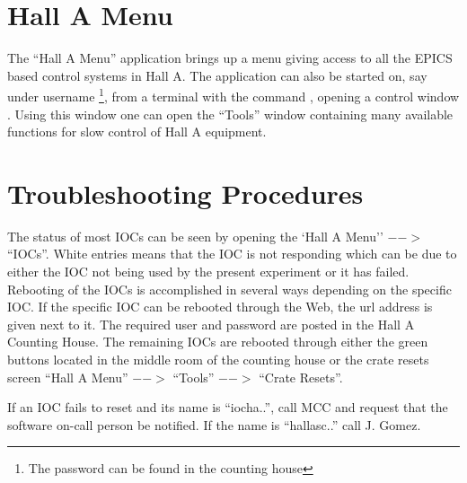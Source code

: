 {\section{Hall A Menu}
\label{sec:contr-ha-menu}
The ``Hall A Menu'' application brings up a menu giving access to all the EPICS 
based control systems in Hall A. The application can also be started on, say 
under username \footnote{The password can be found in the counting house},
from a terminal with the command , opening a control window%
.
Using this window one can open the ``Tools'' window%
 containing
many available functions for slow control of Hall A equipment.

\section{Troubleshooting Procedures}
The status of most IOCs can be seen
by opening the `Hall A Menu'' $-->$ ``IOCs''. White entries means that the IOC
is not responding which can be due to either the IOC not being used by the present
experiment or it has failed. Rebooting of the IOCs is accomplished in several ways
depending on the specific IOC. If the specific IOC can be rebooted through the
Web, the url address is given next to it. The required user and password are
posted in the Hall A Counting House. The remaining IOCs are rebooted through
either the green buttons located in the middle room of the counting house
or the crate resets screen ``Hall A Menu'' $-->$ ``Tools'' $-->$ ``Crate Resets''.

If an IOC fails to reset and its name is ``iocha..'', call MCC and request that
the software on-call person be notified. If the name is ``hallasc..'' call J. Gomez.

}


